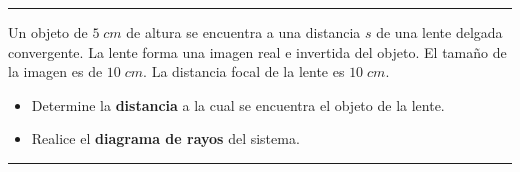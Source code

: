 \documentclass[a4paper,12pt]{exam}
\newcommand{\halmos}{
					\begin{flushright}
						\rule{1mm}{2.5mm} 
					\end{flushright}
					  }
\renewcommand{\qed}{\halmos}
\begin{document}
\begin{questions}

    \begin{question}
		 

\vspace{1ex}
%
%
%

		\qed
		\end{question}
		
	
		\question[2]   Un objeto de $5\;cm$ de altura se encuentra a una distancia $s$ de una lente delgada 
convergente. La lente forma una imagen real e invertida del objeto. El tamaño de la imagen es de
$10\;cm$. La distancia focal de la lente es $10\;cm$.
			\begin{itemize}
				\item[a)] Determine la \textbf{distancia} a la cual se encuentra el objeto de la lente.
				\item[b)] Realice el\textbf{ diagrama de rayos} del sistema.
			\end{itemize}
			\qed
			

\end{questions}
\end{document}
